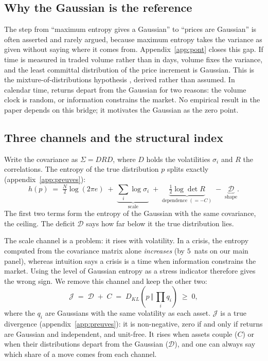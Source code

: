 \documentclass[11pt]{article}
\theoremstyle{definition}
\newcommand{\JJ}{\mathcal{J}}
\newcommand{\DD}{\mathcal{D}}
\newcommand{\KL}[2]{D_{KL}\!\left(#1\,\Vert\,#2\right)}
\begin{document}
\subsection{Why the Gaussian is the reference}

The step from ``maximum entropy gives a Gaussian'' to ``prices are Gaussian''
is often asserted and rarely argued, because maximum entropy takes the
variance as given without saying where it comes from.
Appendix~\ref{app:pont} closes this gap. If time is measured in traded volume
rather than in days, volume fixes the variance, and the least committal
distribution of the price increment is Gaussian. This is the
mixture-of-distributions hypothesis \citep{clark1973,ane2000}, derived rather
than assumed. In calendar time, returns depart from the Gaussian for two
reasons: the volume clock is random, or information constrains the market. No
empirical result in the paper depends on this bridge; it motivates the
Gaussian as the zero point.

\subsection{Three channels and the structural index}

Write the covariance as $\Sigma=DRD$, where $D$ holds the volatilities
$\sigma_i$ and $R$ the correlations. The entropy of the true distribution $p$
splits exactly (appendix~\ref{app:preuves}):
\begin{equation}
\label{eq:three}
h(p) \;=\; \tfrac{N}{2}\log(2\pi e)
\;+\; \underbrace{\textstyle\sum_i \log\sigma_i}_{\text{scale}}
\;+\; \underbrace{\tfrac12\log\det R}_{\text{dependence }(=-C)}
\;-\; \underbrace{\DD}_{\text{shape}} .
\end{equation}
The first two terms form the entropy of the Gaussian with the same covariance,
the ceiling. The deficit $\DD$ says how far below it the true distribution
lies.

The scale channel is a problem: it rises with volatility. In a crisis, the
entropy computed from the covariance matrix alone \emph{increases} (by
$5$~nats on our main panel), whereas intuition says a crisis is a time when
information constrains the market. Using the level of Gaussian entropy as a
stress indicator therefore gives the wrong sign. We remove this channel and
keep the other two:
\begin{equation}
\label{eq:J}
\JJ \;=\; \DD \;+\; C \;=\; \KL{p}{\textstyle\prod_i q_i} \;\ge\; 0 ,
\end{equation}
where the $q_i$ are Gaussians with the same volatility as each asset. $\JJ$ is
a true divergence (appendix~\ref{app:preuves}): it is non-negative, zero if and
only if returns are Gaussian and independent, and unit-free. It rises when
assets couple ($C$) or when their distributions depart from the Gaussian
($\DD$), and one can always say which share of a move comes from each channel.
\end{document}
